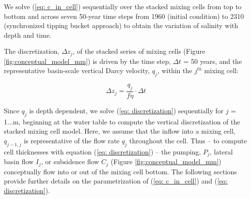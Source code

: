 We solve (\ref{eq: c_in_cell}) sequentially over the stacked mixing cells from top to bottom and across seven 50-year time steps from 1960 (initial condition) to 2310 (synchronized tipping bucket approach) to obtain the variation of salinity with depth and time. 

The discretization, $\Delta z_j$, of the stacked series of mixing cells (Figure \ref{fig:conceptual_model_mm}) is driven by the time step, $\Delta t$ = 50 years, and the representative basin-scale vertical Darcy velocity, $q_j$, within the $j^{th}$ mixing cell:

\begin{equation}
\Delta z_j =  \frac{q_j}{f \eta}  \cdot  \Delta t
\label{eq: discretization}
\end{equation}

Since $q_j$ is depth dependent, we solve (\ref{eq: discretization}) sequentially for $j$ = 1...m, beginning at the water table to compute the vertical discretization of the stacked mixing cell model. Here, we assume that the inflow into a mixing cell, $q_{j-1, j}$ is representative of the flow rate $q_j$ throughout the cell. Thus -- to compute cell thicknesses with equation (\ref{eq: discretization}) -- the pumping, $P_j$, lateral basin flow $I_j$, or subsidence flow $C_j$ (Figure \ref{fig:conceptual_model_mm}) conceptually flow into or out of the mixing cell bottom. The following sections provide further details on the parametrization of (\ref{eq: c_in_cell}) and (\ref{eq: discretization}).

